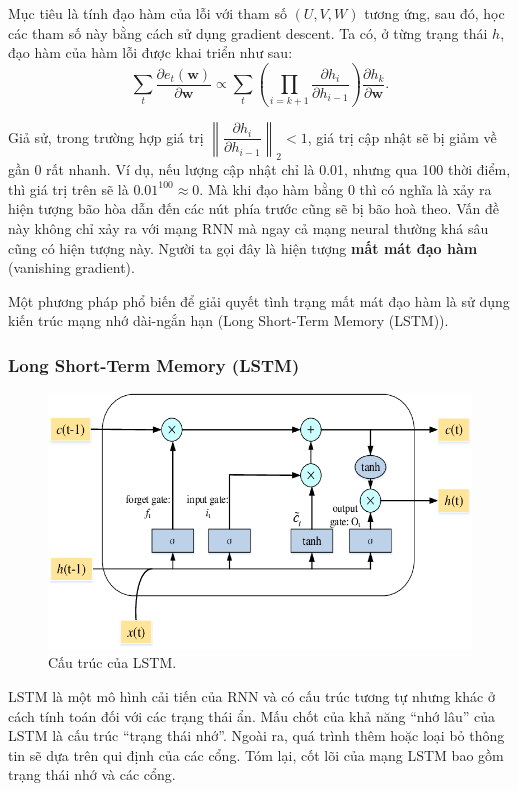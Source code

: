     Mục tiêu là tính đạo hàm của lỗi với tham số $(U, V, W)$ tương ứng, sau đó, học các tham số này bằng cách sử dụng gradient descent. Ta có, ở từng trạng thái $h$, đạo hàm của hàm lỗi được khai triển như sau:
    $$\sum_t\dfrac{\partial e_t(\textbf{w})}{\partial\textbf{w}}\propto\sum_t\left(\prod_{i=k+1}\dfrac{\partial h_i}{\partial h_{i-1}}\right)\dfrac{\partial h_k}{\partial\textbf{w}}.$$
    
    Giả sử, trong trường hợp giá trị $\left\|\dfrac{\partial h_i}{\partial h_{i-1}}\right\|_2 < 1$, giá trị cập nhật sẽ bị giảm về gần 0 rất nhanh. Ví dụ, nếu lượng cập nhật chỉ là 0.01, nhưng qua 100 thời điểm, thì giá trị trên sẽ là $0.01^{100} \approx 0$. Mà khi đạo hàm bằng 0 thì có nghĩa là xảy ra hiện tượng bão hòa dẫn đến các nút phía trước cũng sẽ bị bão hoà theo. Vấn đề này không chỉ xảy ra với mạng RNN mà ngay cả mạng neural thường khá sâu cũng có hiện tượng này. Người ta gọi đây là hiện tượng \textbf{mất mát đạo hàm} (vanishing gradient).
    
    Một phương pháp phổ biến để giải quyết tình trạng mất mát đạo hàm là sử dụng kiến trúc mạng nhớ dài-ngắn hạn (Long Short-Term Memory (LSTM)). 
    
    \subsubsection{Long Short-Term Memory (LSTM)}
    \begin{figure}[htp]
        \centering
        \includegraphics[width=14 cm]{images/lstm_struct.png}
        \caption{Cấu trúc của LSTM. \cite{lstm_struct}}
        \label{fig:lstm_struct}
    \end{figure}
    LSTM là một mô hình cải tiến của RNN và có cấu trúc tương tự nhưng khác ở cách tính toán đối với các trạng thái ẩn. Mấu chốt của khả năng “nhớ lâu” của LSTM là cấu trúc “trạng thái nhớ”. Ngoài ra, quá trình thêm hoặc loại bỏ thông tin sẽ dựa trên qui định của các cổng. Tóm lại, cốt lõi của mạng LSTM bao gồm trạng thái nhớ và các cổng.
    
